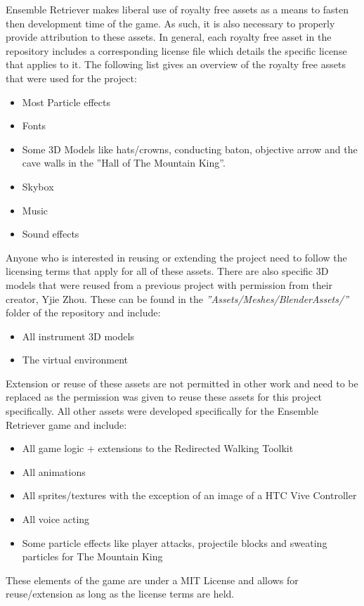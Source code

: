 Ensemble Retriever makes liberal use of royalty free assets as a means to fasten then development time of the game. As such, it is also necessary to properly provide attribution to these assets. In general, each royalty free asset in the repository includes a corresponding license file which details the specific license that applies to it. The following list gives an overview of the royalty free assets that were used for the project:
\begin{itemize}
    \item Most Particle effects
    \item Fonts
    \item Some 3D Models like hats/crowns, conducting baton, objective arrow and the cave walls in the ''Hall of The Mountain King''.
    \item Skybox
    \item Music
    \item Sound effects
\end{itemize}
Anyone who is interested in reusing or extending the project need to follow the licensing terms that apply for all of these assets. There are also specific 3D models that were reused from a previous project with permission from their creator, Yjie Zhou. These can be found in the \emph{''Assets/Meshes/BlenderAssets/''} folder of the repository and include:
\begin{itemize}
    \item All instrument 3D models
    \item The virtual environment
\end{itemize}
Extension or reuse of these assets are not permitted in other work and need to be replaced as the permission was given to reuse these assets for this project specifically. All other assets were developed specifically for the Ensemble Retriever game and include:
\begin{itemize}
    \item All game logic + extensions to the Redirected Walking Toolkit
    \item All animations
    \item All sprites/textures with the exception of an image of a HTC Vive Controller
    \item All voice acting
    \item Some particle effects like player attacks, projectile blocks and sweating particles for The Mountain King 
\end{itemize}
These elements of the game are under a MIT License and allows for reuse/extension as long as the license terms are held. 

